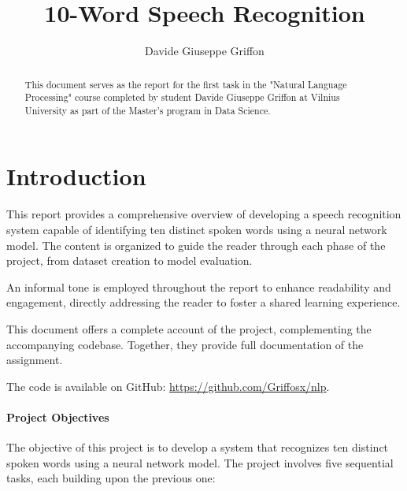 \documentclass[12pt]{article}
\title{10-Word Speech Recognition}
\author{Davide Giuseppe Griffon}
\date{}
\begin{document}
\maketitle

\begin{abstract}
    This document serves as the report for the first task in the "Natural Language Processing" course completed by student Davide Giuseppe Griffon at Vilnius University as part of the Master's program in Data Science.
\end{abstract}

\tableofcontents

\newpage

\section{Introduction}

This report provides a comprehensive overview of developing a speech recognition system capable of identifying ten distinct spoken words using a neural network model. The content is organized to guide the reader through each phase of the project, from dataset creation to model evaluation.

An informal tone is employed throughout the report to enhance readability and engagement, directly addressing the reader to foster a shared learning experience.

This document offers a complete account of the project, complementing the accompanying codebase. Together, they provide full documentation of the assignment.

The code is available on GitHub: \href{https://github.com/Griffosx/nlp}{https://github.com/Griffosx/nlp}.

\paragraph{Project Objectives}

The objective of this project is to develop a system that recognizes ten distinct spoken words using a neural network model. The project involves five sequential tasks, each building upon the previous one:
\end{document}
